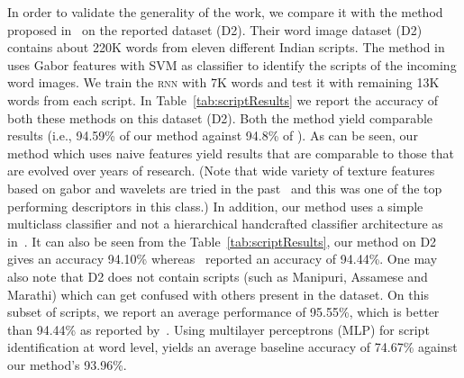 In order to validate the generality of the work, we compare it with the method proposed in~\cite{Pati} on the reported dataset (D2). Their word image dataset (D2) contains about 220K words from eleven different Indian scripts. The method in~\cite{Pati} uses Gabor features with \textsc{SVM} as classifier to identify the scripts of the incoming word images. We train the \textsc{rnn} with 7K words and test it with remaining 13K words from each script. In Table~\ref{tab:scriptResults} we report the accuracy  of both these methods on this dataset (D2). Both the method yield comparable results (i.e.,  94.59\% of our method against 94.8\% of \cite{Pati}). As can be seen, our method which uses naive features yield results that are comparable to those that are evolved over years of research. (Note that wide variety of texture features based on gabor and wavelets are tried in the past~\cite{Pati,Busch05,Joshi07} and this was one of the top performing descriptors in this class.)
In addition, our method uses a simple multiclass classifier and not a hierarchical handcrafted classifier architecture as in~\cite{Pati}. It can also be seen from the Table~\ref{tab:scriptResults}, our method on D2 gives an accuracy 94.10\% whereas~\cite{Pati} reported an accuracy of 94.44\%. One may also note that D2 does not contain scripts (such as Manipuri, Assamese and Marathi) which can get confused with others present in the dataset. On this subset of scripts, we report an average performance of 95.55\%, which is better than 94.44\% as reported by~\cite{Pati}. Using multilayer perceptrons (\textsc{MLP}) for script identification at word level, yields an average baseline accuracy of 74.67\% against our method's 93.96\%. %

